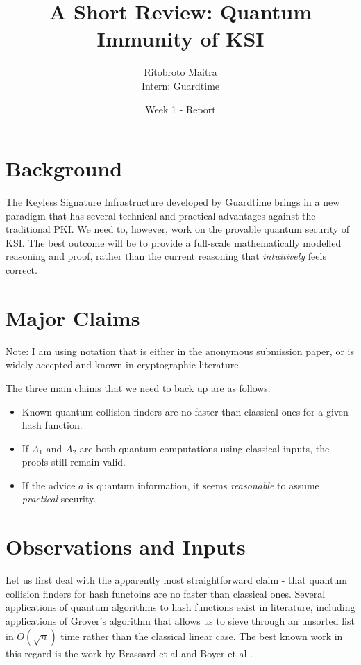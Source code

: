 \documentclass[10pt,a4paper]{article}
\author{Ritobroto Maitra\\ Intern: Guardtime}
\title{A Short Review: Quantum Immunity of KSI}
\date{Week 1 - Report}
\begin{document}
\maketitle

\section{Background}

The Keyless Signature Infrastructure developed by Guardtime brings in a new paradigm that has several technical and practical advantages against the traditional PKI. We need to, however, work on the provable quantum security of KSI. The best outcome will be to provide a full-scale mathematically modelled reasoning and proof, rather than the current reasoning that \textit{intuitively} feels correct.

\section{Major Claims}


Note: I am using notation that is either in the anonymous submission paper, or is widely accepted and known in cryptographic literature. 

The three main claims that we need to back up are as follows:

\begin{itemize}
\item Known quantum collision finders are no faster than classical ones for a given hash function.
\item If $A_1$ and $A_2$ are both quantum computations using classical inputs, the proofs still remain valid.
\item If the advice $a$ is quantum information, it seems \textit{reasonable} to assume \textit{practical} security.
\end{itemize}

\section{Observations and Inputs}

Let us first deal with the apparently most straightforward claim - that quantum collision finders for hash functoins are no faster than classical ones. Several applications of quantum algorithms to hash functions exist in literature, including applications of Grover's algorithm  \cite{gro} that allows us to sieve through an unsorted list in $O(\sqrt{n})$ time rather than the classical linear case. The best known work in this regard is the work by Brassard et al \cite{bra} and Boyer et al \cite{boy}.
\end{document}
